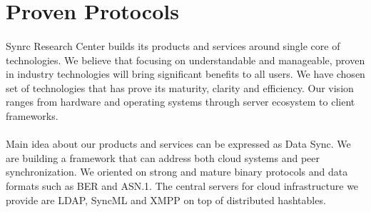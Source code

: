 \documentclass[11pt]{article}
\begin{document}

\section*{Proven Protocols}
\paragraph{}
Synrc Research Center builds its products and services around single core of technologies.
We believe that focusing on understandable and manageable, proven in industry technologies
will bring significant benefits to all users. We have chosen set of technologies that
has prove its maturity, clarity and efficiency. Our vision ranges from hardware and
operating systems through server ecosystem to client frameworks.
\paragraph{}
Main idea about our products and services can be expressed as Data Sync. We are building a framework
that can address both cloud systems and peer synchronization. We oriented on strong and mature
binary protocols and data formats such as BER and ASN.1. The central servers for cloud infrastructure
we provide are LDAP, SyncML and XMPP on top of distributed hashtables.

\end{document}
